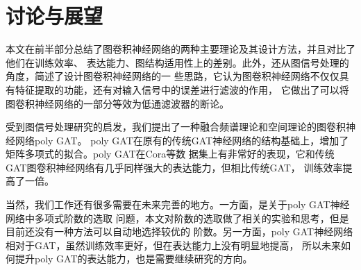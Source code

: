 \cleardoublepage

\section{讨论与展望}

本文在前半部分总结了图卷积神经网络的两种主要理论及其设计方法，并且对比了他们在训练效率、
表达能力、图结构适用性上的差别。此外，还从图信号处理的角度，简述了设计图卷积神经网络的一
些思路，它认为图卷积神经网络不仅仅具有特征提取的功能，还有对输入信号中的误差进行滤波的作用，
它做出了可以将图卷积神经网络的一部分等效为低通滤波器的断论。

受到图信号处理研究的启发，我们提出了一种融合频谱理论和空间理论的图卷积神经网络poly GAT。
poly GAT在原有的传统GAT神经网络的结构基础上，增加了矩阵多项式的拟合。poly GAT在Cora等数
据集上有非常好的表现，它和传统GAT图卷积神经网络有几乎同样强大的表达能力，但相比传统GAT，
训练效率提高了一倍。

当然，我们工作还有很多需要在未来完善的地方。一方面，是关于poly GAT神经网络中多项式阶数的选取
问题，本文对阶数的选取做了相关的实验和思考，但是目前还没有一种方法可以自动地选择较优的
阶数。另一方面，poly GAT神经网络相对于GAT，虽然训练效率更好，但在表达能力上没有明显地提高，
所以未来如何提升poly GAT的表达能力，也是需要继续研究的方向。